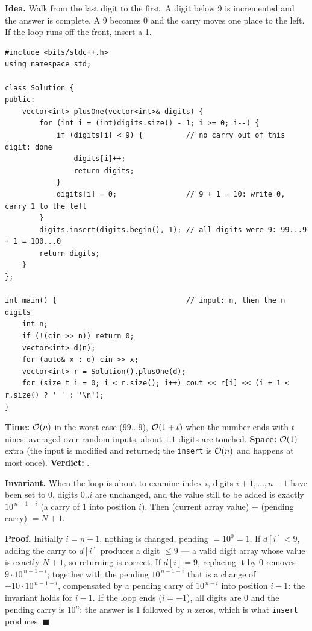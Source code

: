 \begin{algorithmbox}
\textbf{Idea.} Walk from the last digit to the first. A digit below 9 is incremented and the answer is complete. A 9 becomes 0 and the carry moves one place to the left. If the loop runs off the front, insert a 1.
\begin{lstlisting}[style=cpp]
#include <bits/stdc++.h>
using namespace std;

class Solution {
public:
    vector<int> plusOne(vector<int>& digits) {
        for (int i = (int)digits.size() - 1; i >= 0; i--) {
            if (digits[i] < 9) {          // no carry out of this digit: done
                digits[i]++;
                return digits;
            }
            digits[i] = 0;                // 9 + 1 = 10: write 0, carry 1 to the left
        }
        digits.insert(digits.begin(), 1); // all digits were 9: 99...9 + 1 = 100...0
        return digits;
    }
};

int main() {                              // input: n, then the n digits
    int n;
    if (!(cin >> n)) return 0;
    vector<int> d(n);
    for (auto& x : d) cin >> x;
    vector<int> r = Solution().plusOne(d);
    for (size_t i = 0; i < r.size(); i++) cout << r[i] << (i + 1 < r.size() ? ' ' : '\n');
}
\end{lstlisting}
\begin{complexitybox}
\textbf{Time:} $\mathcal{O}(n)$ in the worst case ($99\ldots9$), $\mathcal{O}(1 + t)$ when the number ends with $t$ nines; averaged over random inputs, about $1.1$ digits are touched. \textbf{Space:} $\mathcal{O}(1)$ extra (the input is modified and returned; the \texttt{insert} is $\mathcal{O}(n)$ and happens at most once). \textbf{Verdict:} \ac{}.
\end{complexitybox}
\end{algorithmbox}

\begin{invariantbox}
\textbf{Invariant.} When the loop is about to examine index $i$, digits $i+1, \dots, n-1$ have been set to 0, digits $0..i$ are unchanged, and the value still to be added is exactly $10^{\,n-1-i}$ (a carry of 1 into position $i$). Then (current array value) $+$ (pending carry) $= N + 1$.

\textbf{Proof.} Initially $i = n-1$, nothing is changed, pending $= 10^0 = 1$. If $d[i] < 9$, adding the carry to $d[i]$ produces a digit $\le 9$ --- a valid digit array whose value is exactly $N + 1$, so returning is correct. If $d[i] = 9$, replacing it by 0 removes $9\cdot 10^{\,n-1-i}$; together with the pending $10^{\,n-1-i}$ that is a change of $-10 \cdot 10^{\,n-1-i}$, compensated by a pending carry of $10^{\,n-i}$ into position $i-1$: the invariant holds for $i-1$. If the loop ends ($i = -1$), all digits are 0 and the pending carry is $10^n$: the answer is $1$ followed by $n$ zeros, which is what \texttt{insert} produces. \hfill$\blacksquare$
\end{invariantbox}

